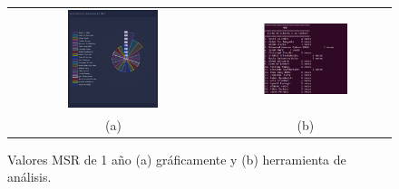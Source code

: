 \documentclass[a4paper, 12pt]{book}
\begin{document}
\begin{figure}[!h]
    \centering
    \begin{tabular}{cc}
    \includegraphics[width=0.45\textwidth]{img/msr_1_year_graph.png} &  
    \includegraphics[width=0.52\textwidth]{img/msr_1_year.png} \\ 
    (a) &(b) 
    \end{tabular}
    \caption{Valores MSR de 1 año (a) gráficamente y (b) herramienta de análisis.}
    \label{fig:comp_msr_1_year}
\end{figure}
\end{document}
